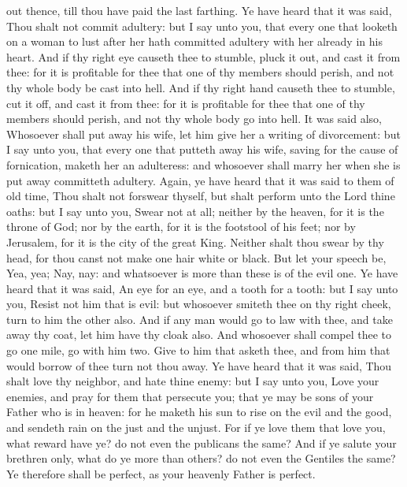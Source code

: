 out thence, till thou have paid the last farthing.  Ye have heard that it was said, Thou shalt not commit adultery: but I say unto you, that every one that looketh on a woman to lust after her hath committed adultery with her already in his heart. And if thy right eye causeth thee to stumble, pluck it out, and cast it from thee: for it is profitable for thee that one of thy members should perish, and not thy whole body be cast into hell. And if thy right hand causeth thee to stumble, cut it off, and cast it from thee: for it is profitable for thee that one of thy members should perish, and not thy whole body go into hell. It was said also, Whosoever shall put away his wife, let him give her a writing of divorcement: but I say unto you, that every one that putteth away his wife, saving for the cause of fornication, maketh her an adulteress: and whosoever shall marry her when she is put away committeth adultery.  Again, ye have heard that it was said to them of old time, Thou shalt not forswear thyself, but shalt perform unto the Lord thine oaths: but I say unto you, Swear not at all; neither by the heaven, for it is the throne of God; nor by the earth, for it is the footstool of his feet; nor by Jerusalem, for it is the city of the great King. Neither shalt thou swear by thy head, for thou canst not make one hair white or black. But let your speech be, Yea, yea; Nay, nay: and whatsoever is more than these is of the evil one.  Ye have heard that it was said, An eye for an eye, and a tooth for a tooth: but I say unto you, Resist not him that is evil: but whosoever smiteth thee on thy right cheek, turn to him the other also. And if any man would go to law with thee, and take away thy coat, let him have thy cloak also. And whosoever shall compel thee to go one mile, go with him two. Give to him that asketh thee, and from him that would borrow of thee turn not thou away.  Ye have heard that it was said, Thou shalt love thy neighbor, and hate thine enemy: but I say unto you, Love your enemies, and pray for them that persecute you; that ye may be sons of your Father who is in heaven: for he maketh his sun to rise on the evil and the good, and sendeth rain on the just and the unjust. For if ye love them that love you, what reward have ye? do not even the publicans the same? And if ye salute your brethren only, what do ye more than others? do not even the Gentiles the same? Ye therefore shall be perfect, as your heavenly Father is perfect. 

